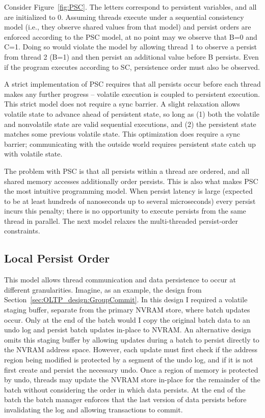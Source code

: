 Consider Figure~\ref{fig:PSC}.
The letters correspond to persistent variables, and all are initialized to 0.
Assuming threads execute under a sequential consistency model (i.e., they observe shared values from that model) and persist orders are enforced according to the PSC model, at no point may we observe that B=0 and C=1.
Doing so would violate the model by allowing thread 1 to observe a persist from thread 2 (B=1) and then persist an additional value before B persists.
Even if the program executes according to SC, persistence order must also be observed.

A strict implementation of PSC requires that all persists occur before each thread makes any further progress -- volatile execution is coupled to persistent execution.
This strict model does not require a sync barrier.
A slight relaxation allows volatile state to advance ahead of persistent state, so long as (1) both the volatile and nonvolatile state are valid sequential executions, and (2) the persistent state matches some previous volatile state.
This optimization does require a sync barrier; communicating with the outside world requires persistent state catch up with volatile state.

The problem with PSC is that all persists within a thread are ordered, and all shared memory accesses additionally order persists.
This is also what makes PSC the most intuitive programming model.
When persist latency is large (expected to be at least hundreds of nanoseconds up to several microseconds) every persist incurs this penalty; there is no opportunity to execute persists from the same thread in parallel.
The next model relaxes the multi-threaded persist-order constraints.

\subsection{Local Persist Order}
\label{sec:PMC:PersistenceModels:LPO}

This model allows thread communication and data persistence to occur at different granularities.
Imagine, as an example, the \GroupCommit design from Section~\ref{sec:OLTP_design:GroupCommit}.
In this design I required a volatile staging buffer, separate from the primary NVRAM store, where batch updates occur.
Only at the end of the batch would I copy the original batch data to an undo log and persist batch updates in-place to NVRAM.
An alternative design omits this staging buffer by allowing updates during a batch to persist directly to the NVRAM address space.
However, each update must first check if the address region being modified is protected by a segment of the undo log, and if it is not first create and persist the necessary undo.
Once a region of memory is protected by undo, threads may update the NVRAM store in-place for the remainder of the batch without considering the order in which data persists.
At the end of the batch the batch manager enforces that the last version of data persists before invalidating the log and allowing transactions to commit.

